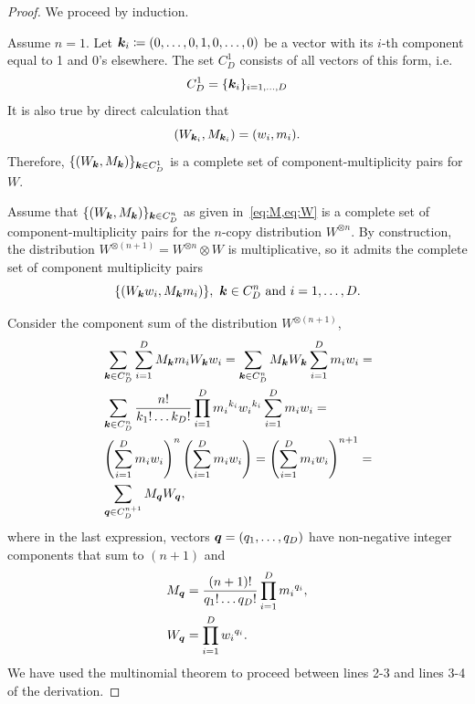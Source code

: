 \begin{proof}
	We proceed by induction.
	
	Assume $n = 1$.
	Let $\bm{k}_i \coloneqq (0,\dots,0,1,0,\dots,0)$ be a vector with its $i$-th component equal to 1 and 0's elsewhere.
	The set $C_D^1$ consists of all vectors of this form, i.e. 
\begin{equation*}
	C_D^1 = \{ \bm{k}_i \}_{i=1,\dots,D}
\end{equation*}
	It is also true by direct calculation that
\begin{equation*}
	\left( W_{\bm{k}_i}, M_{\bm{k}_i} \right) = (w_i, m_i).
\end{equation*}
Therefore, $\{ (W_{\bm{k}}, M_{\bm{k}}) \}_{\bm{k} \in C_D^1}$ is a complete set of component-multiplicity pairs for $W$.

	Assume that $\{(W_{\bm{k}}, M_{\bm{k}})\}_{\bm{k} \in C_D^n}$ as given in~\cref{eq:M,eq:W} is a complete set of component-multiplicity pairs for the $n$-copy distribution $W^{\otimes n}$.
	By construction, the distribution $W^{\otimes (n+1)} = W^{\otimes n} \otimes W$ is multiplicative, so it admits the complete set of component multiplicity pairs
\begin{equation}
	\{(W_{\bm{k}} w_i, M_{\bm{k}} m_i)\},\ \bm{k} \in C_D^n \text{ and } i=1,\dots,D.
\end{equation}
	
	Consider the component sum of the distribution $W^{\otimes (n+1)}$,
\begin{align*}
	&\sum_{\bm{k} \in C_D^n}\sum_{i=1}^D M_{\bm{k}} m_i W_{\bm{k}} w_i = \sum_{\bm{k} \in C_D^n} M_{\bm{k}}W_{\bm{k}} \sum_{i=1}^D m_i w_i =\\
	&\sum_{\bm{k} \in C_D^n} \frac{n!}{k_1!\dots k_D!} \prod\limits_{i=1}^D {m_i}^{k_i}{w_i}^{k_i} \sum_{i=1}^D m_i w_i =\\
	&\left( \sum_{i=1}^D m_i w_i \right)^n \left( \sum_{i=1}^D m_i w_i \right) = \left( \sum_{i=1}^D m_i w_i \right)^{n+1} =\\
	&\sum_{\bm{q} \in C_D^{n+1}} M_{\bm{q}}W_{\bm{q}},
\end{align*}
where in the last expression, vectors $\bm{q} = (q_1, \dots, q_D)$ have non-negative integer components that sum to $(n+1)$ and 
\begin{align*}
	M_{\bm{q}} &= \frac{(n+1)!}{q_1!\dots q_D!} \prod\limits_{i=1}^D {m_i}^{q_i},\\
	W_{\bm{q}} &= \prod\limits_{i=1}^D {w_i}^{q_i}.
\end{align*}
We have used the multinomial theorem to proceed between lines 2-3 and lines 3-4 of the derivation.


\end{proof}
